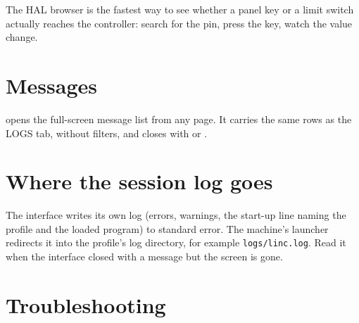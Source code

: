 \begin{tipbox}
  The HAL browser is the fastest way to see whether a panel key or a limit switch actually
  reaches the controller: search for the pin, press the key, watch the value change.
\end{tipbox}

\section{Messages}

 opens the full-screen message list from any page. It carries the same rows as the
LOGS tab, without filters, and closes with  or .

\section{Where the session log goes}

The interface writes its own log (errors, warnings, the start-up line naming the profile and
the loaded program) to standard error. The machine's launcher redirects it into the profile's
log directory, for example \texttt{logs/linc.log}. Read it when the interface closed with a
message but the screen is gone.

\section{Troubleshooting}

